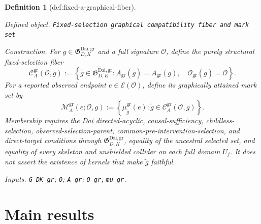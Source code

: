 \documentclass{article}
\newtheorem{definition}{Definition}
\begin{document}
\begin{definition}[def:fixed-a-graphical-fiber]\label{def:fixed-a-graphical-fiber}
\par\smallskip\noindent\emph{Defined object.} \texttt{Fixed-\allowbreak{}selection graphical compatibility fiber and mark set}
\par\smallskip\noindent\emph{Construction.} For \(g\in\mathfrak G_{D,K}^{\mathrm{Dai,gr}}\) and a full signature \(\mathcal O\), define the purely structural fixed-selection fiber
\[
 \mathcal C_A^{\mathrm{gr}}(\mathcal O,g)
 :=\left\{\widetilde g\in\mathfrak G_{D,K}^{\mathrm{Dai,gr}}:
 A_{\mathrm{gr}}(\widetilde g)=A_{\mathrm{gr}}(g),\quad
 \mathcal O_{\mathrm{gr}}(\widetilde g)=\mathcal O\right\}.
\]
For a reported observed endpoint \(e\in\mathcal E(\mathcal O)\), define its graphically attained mark set by
\[
 \mathcal M_A^{\mathrm{gr}}(e;\mathcal O,g)
 :=\left\{\mu^{\mathrm{gr}}_{\widetilde g}(e):
 \widetilde g\in\mathcal C_A^{\mathrm{gr}}(\mathcal O,g)\right\}.
\]
Membership requires the Dai directed-acyclic, causal-sufficiency, childless-selection, observed-selection-parent, common-pre-intervention-selection, and direct-target conditions through \(\mathfrak G_{D,K}^{\mathrm{Dai,gr}}\), equality of the ancestral selected set, and equality of every skeleton and unshielded collider on each full domain \(U_j\).  It does not assert the existence of kernels that make \(\widetilde g\) faithful.
\par\smallskip\noindent\emph{Inputs.} \texttt{G\_\allowbreak{}DK\_\allowbreak{}gr}; \texttt{O}; \texttt{A\_\allowbreak{}gr}; \texttt{O\_\allowbreak{}gr}; \texttt{mu\_\allowbreak{}gr}.
\end{definition}

\section{Main results}
\end{document}
